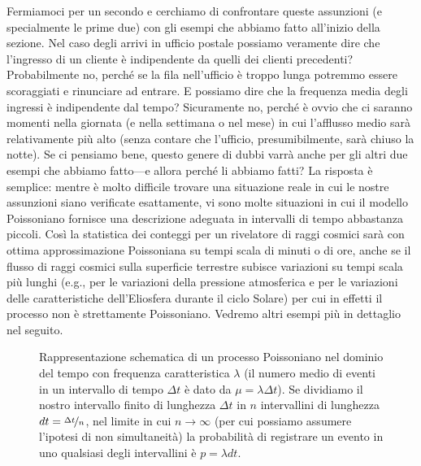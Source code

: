 Fermiamoci per un secondo e cerchiamo di confrontare queste assunzioni (e
specialmente le prime due) con gli esempi che abbiamo fatto all'inizio della
sezione. Nel caso degli arrivi in ufficio postale possiamo veramente dire che
l'ingresso di un cliente è indipendente da quelli dei clienti precedenti?
Probabilmente no, perché se la fila nell'ufficio è troppo lunga potremmo
essere scoraggiati e rinunciare ad entrare. E possiamo dire che la frequenza
media degli ingressi è indipendente dal tempo? Sicuramente no, perché è
ovvio che ci saranno momenti nella giornata (e nella settimana o nel mese) in
cui l'afflusso medio sarà relativamente più alto (senza contare che
l'ufficio, presumibilmente, sarà chiuso la notte). Se ci pensiamo bene, questo
genere di dubbi varrà anche per gli altri due esempi che abbiamo fatto---e
allora perché li abbiamo fatti? La risposta è semplice: mentre è molto
difficile trovare una situazione reale in cui le nostre assunzioni siano
verificate esattamente, vi sono molte situazioni in cui il modello Poissoniano
fornisce una descrizione adeguata in intervalli di tempo abbastanza piccoli.
Così la statistica dei conteggi per un rivelatore di raggi cosmici sarà con
ottima approssimazione Poissoniana su tempi scala di minuti o di ore, anche se
il flusso di raggi cosmici sulla superficie terrestre subisce variazioni su
tempi scala più lunghi (e.g., per le variazioni della pressione atmosferica
e per le variazioni delle caratteristiche dell'Eliosfera durante il ciclo
Solare) per cui in effetti il processo non è strettamente Poissoniano.
Vedremo altri esempi più in dettaglio nel seguito.

\begin{figure}[htb!]
  \begin{center}
    
  \end{center}
  \caption{Rappresentazione schematica di un processo Poissoniano nel dominio
    del tempo con frequenza caratteristica $\lambda$ (il numero medio di
    eventi in un intervallo di tempo $\Delta t$ è dato da
    $\mu = \lambda \Delta t$). Se dividiamo il nostro intervallo finito di
    lunghezza $\Delta t$ in $n$ intervallini di lunghezza
    $dt = \nicefrac{\Delta t}{n}$, nel limite in cui $n \rightarrow \infty$
    (per cui possiamo assumere l'ipotesi di non simultaneità) la
    probabilità di registrare un evento in uno qualsiasi degli intervallini
    è $p = \lambda dt$.
  }
  \label{fig:processo_poissoniano}
\end{figure}


